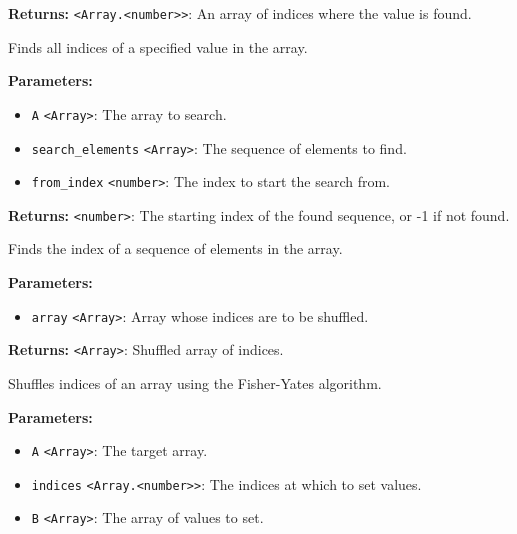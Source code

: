 \documentclass[12pt,a4paper]{article}
\begin{document}
\noindent \textbf{Returns:} \texttt{<Array.<number>>}: An array of indices where the value is found.

\noindent Finds all indices of a specified value in the array.

\vspace{5mm}
\noindent {}


\noindent \textbf{Parameters:}
\begin{itemize}
  \item \texttt{A} \texttt{<Array>}: The array to search.
  \item \texttt{search\_elements} \texttt{<Array>}: The sequence of elements to find.
  \item \texttt{from\_index} \texttt{<number>}: The index to start the search from.
\end{itemize}

\noindent \textbf{Returns:} \texttt{<number>}: The starting index of the found sequence, or -1 if not found.

\noindent Finds the index of a sequence of elements in the array.

\vspace{5mm}
\noindent {}


\noindent \textbf{Parameters:}
\begin{itemize}
  \item \texttt{array} \texttt{<Array>}: Array whose indices are to be shuffled.
\end{itemize}

\noindent \textbf{Returns:} \texttt{<Array>}: Shuffled array of indices.

\noindent Shuffles indices of an array using the Fisher-Yates algorithm.

\vspace{5mm}
\noindent {}


\noindent \textbf{Parameters:}
\begin{itemize}
  \item \texttt{A} \texttt{<Array>}: The target array.
  \item \texttt{indices} \texttt{<Array.<number>>}: The indices at which to set values.
  \item \texttt{B} \texttt{<Array>}: The array of values to set.
\end{itemize}
\end{document}
